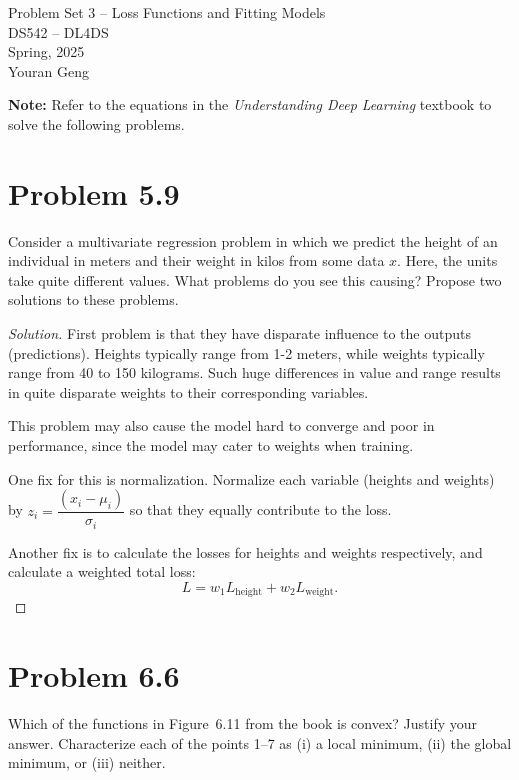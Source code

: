 \documentclass[10pt]{article}
\begin{document}
\begin{center}
    \LARGE {Problem Set 3 – Loss Functions and Fitting Models} \\[1em]
    \Large{DS542 – DL4DS} \\[0.5em]
    \large Spring, 2025 \\
    \large Youran Geng
\end{center}

\vspace{2em}

\noindent\textbf{Note:} Refer to the equations in the \textit{Understanding Deep Learning} textbook to solve the following problems.

\vspace{2em}

\section*{Problem 5.9}
Consider a multivariate regression problem in which we predict the height of an individual in meters and their weight in kilos from some data $x$. Here, the units take quite different values. What problems do you see this causing? Propose two solutions to these problems.

\begin{proof}[Solution]
    First problem is that they have disparate influence to the outputs (predictions). Heights typically range from 1-2 meters, while weights typically range from 40 to 150 kilograms. Such huge differences in value and range results in quite disparate weights to their corresponding variables. 

    This problem may also cause the model hard to converge and poor in performance, since the model may cater to weights when training. 

    One fix for this is normalization. Normalize each variable (heights and weights) by \(z_i = \dfrac{(x_i - \mu_i)}{\sigma_i}\) so that they equally contribute to the loss. 

    Another fix is to calculate the losses for heights and weights respectively, and calculate a weighted total loss: 
    \begin{equation*}
        L = w_1 L_{\mathrm{height}} + w_2 L_{\mathrm{weight}}. 
    \end{equation*}
\end{proof}

\vspace{5em}

\section*{Problem 6.6}
Which of the functions in Figure~6.11 from the book is convex? Justify your answer. Characterize each of the points 1--7 as (i) a local minimum, (ii) the global minimum, or (iii) neither.
\end{document}
